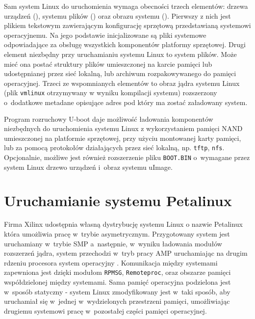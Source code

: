 Sam system Linux do uruchomienia wymaga obecności trzech elementów: drzewa urządzeń (), systemu plików () oraz obrazu systemu (). Pierwszy z nich jest plikiem tekstowym zawierającym konfigurację sprzętową przedstawianą systemowi operacyjnemu. Na jego podstawie inicjalizowane są pliki systemowe odpowiadające za obsługę wszystkich komponentów platformy sprzętowej. Drugi element niezbędny przy uruchamianiu systemu Linux to system plików. Może mieć ona postać struktury plików umieszczonej na karcie pamięci lub udostępnianej przez sieć lokalną, lub archiwum rozpakowywanego do pamięci operacyjnej. Trzeci ze wspomnianych elementów to obraz jądra systemu Linux (plik \texttt{vmlinux} otrzymywany w wyniku kompilacji systemu) rozszerzony o~dodatkowe metadane opisujące adres pod który ma zostać załadowany system. 

Program rozruchowy U-boot daje możliwość ładowania komponentów niezbędnych do uruchomienia systemu Linux z wykorzystaniem pamięci NAND umieszczonej na platformie sprzętowej, przy użyciu montowanej karty pamięci, lub za pomocą protokołów działających przez sieć lokalną, np. \texttt{tftp}, \texttt{nfs}. Opcjonalnie, możliwe jest również rozszerzenie pliku \texttt{BOOT.BIN} o~wymagane przez system Linux drzewo urządzeń i~obraz systemu uImage.





\section{Uruchamianie systemu Petalinux} 
\label{sec:uruchamianie_systemu_petalinux}

Firma Xilinx udostępnia własną dystrybucję systemu Linux o nazwie Petalinux która umożliwia pracę w~trybie asymetrycznym\cite{petaUG}. Przygotowany system jest uruchamiany w~trybie SMP a~następnie, w~wyniku ładowania modułów rozszerzeń jądra, system przechodzi w~tryb pracy AMP uruchamiając na drugim rdzeniu procesora system operacyjny . Komunikacja między systemami zapewniona jest dzięki modułom \texttt{RPMSG}, \texttt{Remoteproc}, oraz obszarze pamięci współdzielonej między systemami. Sama pamięć operacyjna podzielona jest w~sposób statyczny - system Linux zmodyfikowany jest w~taki sposób, aby uruchamiał się w~jednej w~wydzielonych przestrzeni pamięci, umożliwiając drugiemu systemowi pracę w~pozostałej części pamięci operacyjnej. 

